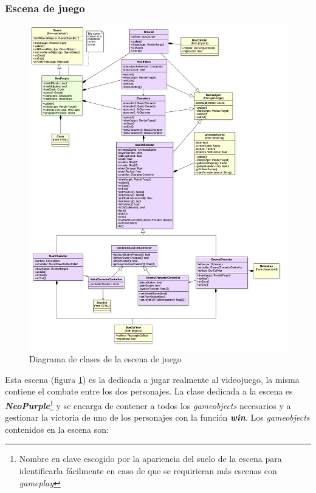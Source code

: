 \subsubsection*{Escena de juego}

\begin{figure}
	\caption{Diagrama de clases de la escena de juego}
	\hspace*{+1cm}  
	\centerline{\includegraphics[width=20cm]{otros/UML/png/alld/png/gamelogic__gameplay__diagramaDeClases_scene_gameplay_4.png}}
	\label{class:gameplay}
\end{figure}

Esta escena (figura \ref{class:gameplay}) es la dedicada a jugar realmente al videojuego, la misma contiene el combate entre los dos personajes. La clase dedicada a la escena es \textbf{\textit{NeoPurple}}\footnote{Nombre en clave escogido por la apariencia del suelo de la escena para identificarla fácilmente en caso de que se requirieran más escenas con \textit{gameplay}} y se encarga de contener a todos los \textit{gameobjects} necesarios y a gestionar la victoria de uno de los personajes con la función \textbf{\textit{win}}. Los \textit{gameobjects} contenidos en la escena son:

